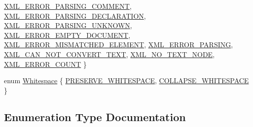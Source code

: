 \begin{DoxyCompactItemize}
\newline
\hyperlink{namespacetinyxml2_a1fbf88509c3ac88c09117b1947414e08a51786809e8b079c770853cf5890a7a35}{X\+M\+L\+\_\+\+E\+R\+R\+O\+R\+\_\+\+P\+A\+R\+S\+I\+N\+G\+\_\+\+C\+O\+M\+M\+E\+NT}, 
\hyperlink{namespacetinyxml2_a1fbf88509c3ac88c09117b1947414e08ad45b208578e30dab5a21bff1d8991b87}{X\+M\+L\+\_\+\+E\+R\+R\+O\+R\+\_\+\+P\+A\+R\+S\+I\+N\+G\+\_\+\+D\+E\+C\+L\+A\+R\+A\+T\+I\+ON}, 
\hyperlink{namespacetinyxml2_a1fbf88509c3ac88c09117b1947414e08a95a88813812a680fb7372f0149420a97}{X\+M\+L\+\_\+\+E\+R\+R\+O\+R\+\_\+\+P\+A\+R\+S\+I\+N\+G\+\_\+\+U\+N\+K\+N\+O\+WN}, 
\hyperlink{namespacetinyxml2_a1fbf88509c3ac88c09117b1947414e08a1a0478cf44f0a733aa6f21bdf0db80b5}{X\+M\+L\+\_\+\+E\+R\+R\+O\+R\+\_\+\+E\+M\+P\+T\+Y\+\_\+\+D\+O\+C\+U\+M\+E\+NT}, 
\newline
\hyperlink{namespacetinyxml2_a1fbf88509c3ac88c09117b1947414e08a0cecc816939d9155d33b8a88fd50e4c1}{X\+M\+L\+\_\+\+E\+R\+R\+O\+R\+\_\+\+M\+I\+S\+M\+A\+T\+C\+H\+E\+D\+\_\+\+E\+L\+E\+M\+E\+NT}, 
\hyperlink{namespacetinyxml2_a1fbf88509c3ac88c09117b1947414e08af6b4caa10e1f2e9f19a3a24f5f3ce223}{X\+M\+L\+\_\+\+E\+R\+R\+O\+R\+\_\+\+P\+A\+R\+S\+I\+NG}, 
\hyperlink{namespacetinyxml2_a1fbf88509c3ac88c09117b1947414e08afdb8840395a7c13dfe6a3e104401c095}{X\+M\+L\+\_\+\+C\+A\+N\+\_\+\+N\+O\+T\+\_\+\+C\+O\+N\+V\+E\+R\+T\+\_\+\+T\+E\+XT}, 
\hyperlink{namespacetinyxml2_a1fbf88509c3ac88c09117b1947414e08a5300bec98feccc8f0cdf567b88821f33}{X\+M\+L\+\_\+\+N\+O\+\_\+\+T\+E\+X\+T\+\_\+\+N\+O\+DE}, 
\newline
\hyperlink{namespacetinyxml2_a1fbf88509c3ac88c09117b1947414e08a9ebb2775c56387353f5b2de94f6ab71d}{X\+M\+L\+\_\+\+E\+R\+R\+O\+R\+\_\+\+C\+O\+U\+NT}
 \}
\item 
enum \hyperlink{namespacetinyxml2_a7f91d00f77360f850fd5da0861e27dd5}{Whitespace} \{ \hyperlink{namespacetinyxml2_a7f91d00f77360f850fd5da0861e27dd5a751769aa625fe5fe5286e9779edec56a}{P\+R\+E\+S\+E\+R\+V\+E\+\_\+\+W\+H\+I\+T\+E\+S\+P\+A\+CE}, 
\hyperlink{namespacetinyxml2_a7f91d00f77360f850fd5da0861e27dd5a9a4a309029a6f5e636e20ef5e0b65136}{C\+O\+L\+L\+A\+P\+S\+E\+\_\+\+W\+H\+I\+T\+E\+S\+P\+A\+CE}
 \}
\end{DoxyCompactItemize}


\subsection{Enumeration Type Documentation}
\mbox{\label{namespacetinyxml2_a7f91d00f77360f850fd5da0861e27dd5}} 
